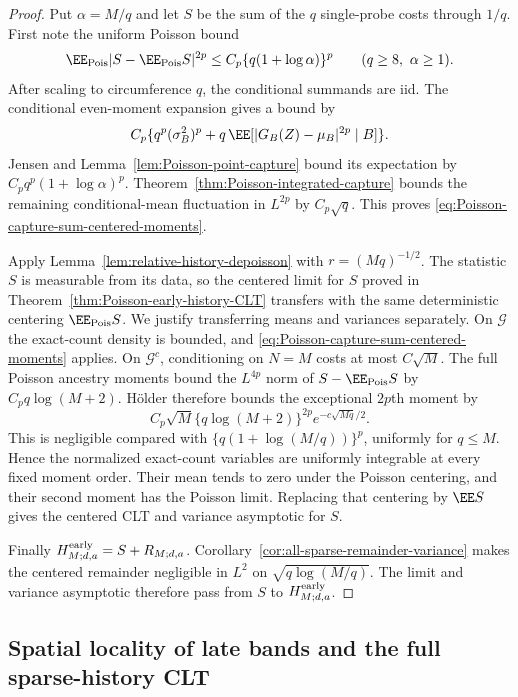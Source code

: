 \documentclass[11pt,letterpaper]{article}
\begin{document}
\begin{proof}
Put $\alpha=M/q$ and let $S$ be the sum of the $q$ single-probe
costs through $1/q$. First note the uniform Poisson bound
\begin{equation}\label{eq:Poisson-capture-sum-centered-moments}
 \EE_{\rm Pois}|S-\EE_{\rm Pois}S|^{2p}
            \le C_p\{q(1+\log\alpha)\}^p
                       \qquad(q\ge8,\ \alpha\ge1).
\end{equation}
After scaling to circumference $q$, the conditional summands
are iid. The conditional even-moment expansion gives a bound
by
\[
 C_p\{q^p(\sigma_B^2)^p
          +q\,\EE[|G_B(Z)-\mu_B|^{2p}\mid B]\}.
\]
Jensen and Lemma~\ref{lem:Poisson-point-capture} bound its
expectation by $C_pq^p(1+\log\alpha)^p$.
Theorem~\ref{thm:Poisson-integrated-capture} bounds the
remaining conditional-mean fluctuation in $L^{2p}$ by
$C_p\sqrt q$.
This proves \eqref{eq:Poisson-capture-sum-centered-moments}.

Apply Lemma~\ref{lem:relative-history-depoisson} with
$r=(Mq)^{-1/2}$. The statistic $S$ is measurable from its data,
so the centered limit for $S$ proved in
Theorem~\ref{thm:Poisson-early-history-CLT} transfers with the same
deterministic centering $\EE_{\rm Pois}S$.
We justify transferring means and variances separately.
On $\mathcal G$ the exact-count density is bounded, and
\eqref{eq:Poisson-capture-sum-centered-moments} applies.
On $\mathcal G^c$, conditioning on $N=M$ costs at most
$C\sqrt M$. The full Poisson ancestry moments bound the
$L^{4p}$ norm of $S-\EE_{\rm Pois}S$ by
$C_pq\log(M+2)$. H\"older therefore bounds the exceptional
$2p$th moment by
\[
 C_p\sqrt M\{q\log(M+2)\}^{2p}e^{-c\sqrt{Mq}/2}.
\]
This is negligible compared with
$\{q(1+\log(M/q))\}^p$, uniformly for $q\le M$.
Hence the normalized exact-count variables are uniformly
integrable at every fixed moment order. Their mean tends to
zero under the Poisson centering, and their second moment
has the Poisson limit. Replacing that centering by
$\EE S$ gives the centered CLT and variance asymptotic for $S$.

Finally $H^{\rm early}_{M;d,a}=S+R_{M;d,a}$.
Corollary~\ref{cor:all-sparse-remainder-variance} makes the
centered remainder negligible in $L^2$ on
$\sqrt{q\log(M/q)}$. The limit and variance asymptotic
therefore pass from $S$ to $H^{\rm early}_{M;d,a}$.
\end{proof}

\subsection{Spatial locality of late bands and the full sparse-history CLT}
\label{sec:late-history-variance}
\end{document}
